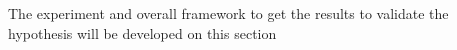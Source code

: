 
The experiment and overall framework to get the results to validate the hypothesis will be developed on this section
